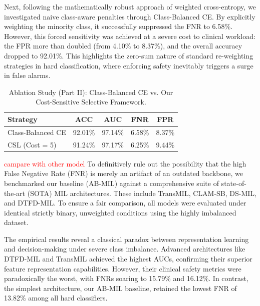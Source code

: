 \documentclass[UTF8,12pt]{article}
\begin{document}
Next, following the mathematically robust approach of weighted cross-entropy, we investigated naive class-aware penalties through Class-Balanced CE. By explicitly weighting the minority class, it successfully suppressed the FNR to 6.58\%. However, this forced sensitivity was achieved at a severe cost to clinical workload: the FPR more than doubled (from 4.10\% to 8.37\%), and the overall accuracy dropped to 92.01\%. This highlights the zero-sum nature of standard re-weighting strategies in hard classification, where enforcing safety inevitably triggers a surge in false alarms.

\begin{table}[htbp]
  \centering
  \caption{Ablation Study (Part II): Class-Balanced CE vs. Our Cost-Sensitive Selective Framework.}
  \label{tab:loss_cost_sensitive}
  \begin{tabular}{lcccc}
    \toprule
    \textbf{Strategy} & ACC & AUC & FNR  & FPR \\
    \midrule
    Class-Balanced CE & 92.01\% & 97.14\% & 6.58\% & 8.37\% \\
    CSL (Cost = 5)    & 91.24\% & 97.17\% & 6.25\% & 9.44\% \\
    \bottomrule
  \end{tabular}
\end{table}

\textcolor{red}{campare with other model}
To definitively rule out the possibility that the high False Negative Rate (FNR) is merely an artifact of an outdated backbone, we benchmarked our baseline (AB-MIL) against a comprehensive suite of state-of-the-art (SOTA) MIL architectures. These include TransMIL, CLAM-SB, DS-MIL, and DTFD-MIL. To ensure a fair comparison, all models were evaluated under identical strictly binary, unweighted conditions using the highly imbalanced dataset. 

The empirical results reveal a classical paradox between representation learning and decision-making under severe class imbalance. Advanced architectures like DTFD-MIL and TransMIL achieved the highest AUCs, confirming their superior feature representation capabilities. However, their clinical safety metrics were paradoxically the worst, with FNRs soaring to 15.79\% and 16.12\%. In contrast, the simplest architecture, our AB-MIL baseline, retained the lowest FNR of 13.82\% among all hard classifiers. 
\end{document}
